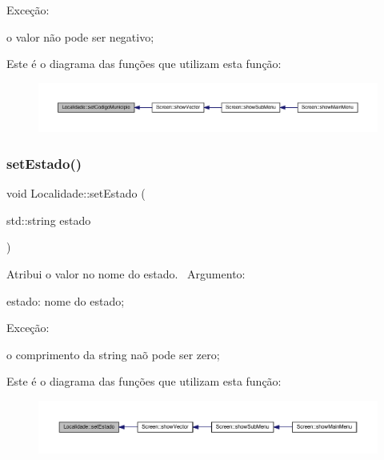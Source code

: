 Exceção\+:
\begin{DoxyItemize}
\item o valor não pode ser negativo;
\end{DoxyItemize}Este é o diagrama das funções que utilizam esta função\+:\nopagebreak
\begin{figure}[H]
\begin{center}
\leavevmode
\includegraphics[width=350pt]{classLocalidade_a38bb0027272b4b39b88698dc5820fbc6_icgraph}
\end{center}
\end{figure}
\mbox{\label{classLocalidade_a71acb8cadaee73dbdf27a244cc9d5135}} 
\subsubsection{\texorpdfstring{set\+Estado()}{setEstado()}}
{\footnotesize\ttfamily void Localidade\+::set\+Estado (\begin{DoxyParamCaption}\item[{std\+::string}]{estado }\end{DoxyParamCaption})}

Atribui o valor no nome do estado.~\newline
 Argumento\+:
\begin{DoxyItemize}
\item estado\+: nome do estado;
\end{DoxyItemize}

Exceção\+:
\begin{DoxyItemize}
\item o comprimento da string naõ pode ser zero;
\end{DoxyItemize}Este é o diagrama das funções que utilizam esta função\+:\nopagebreak
\begin{figure}[H]
\begin{center}
\leavevmode
\includegraphics[width=350pt]{classLocalidade_a71acb8cadaee73dbdf27a244cc9d5135_icgraph}
\end{center}
\end{figure}
\mbox{\label{classLocalidade_af9abc70199d4f50cd90add07c6d6e617}} 

